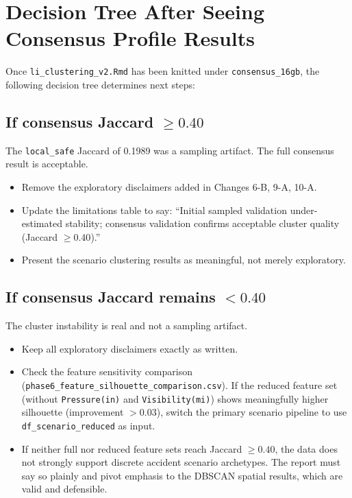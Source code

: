 \documentclass[11pt]{article}
\newcommand{\rfile}[1]{\texttt{#1}}
\newcommand{\rcode}[1]{\texttt{#1}}
\begin{document}
\section{Decision Tree After Seeing Consensus Profile Results}

Once \rfile{li\_clustering\_v2.Rmd} has been knitted under
\rcode{consensus\_16gb}, the following decision tree determines next steps:

\subsection{If consensus Jaccard $\geq 0.40$}

The \rcode{local\_safe} Jaccard of 0.1989 was a sampling artifact.
The full consensus result is acceptable.

\begin{itemize}
\item Remove the exploratory disclaimers added in Changes 6-B, 9-A, 10-A.
\item Update the limitations table to say: ``Initial sampled validation
  under-estimated stability; consensus validation confirms acceptable
  cluster quality (Jaccard $\geq 0.40$).''
\item Present the scenario clustering results as meaningful, not merely
  exploratory.
\end{itemize}

\subsection{If consensus Jaccard remains $< 0.40$}

The cluster instability is real and not a sampling artifact.

\begin{itemize}
\item Keep all exploratory disclaimers exactly as written.
\item Check the feature sensitivity comparison
  (\rcode{phase6\_feature\_silhouette\_comparison.csv}). If the reduced
  feature set (without \rcode{Pressure(in)} and \rcode{Visibility(mi)})
  shows meaningfully higher silhouette (improvement $> 0.03$), switch the
  primary scenario pipeline to use \rcode{df\_scenario\_reduced} as input.
\item If neither full nor reduced feature sets reach Jaccard $\geq 0.40$,
  the data does not strongly support discrete accident scenario archetypes.
  The report must say so plainly and pivot emphasis to the DBSCAN spatial
  results, which are valid and defensible.
\end{itemize}
\end{document}
